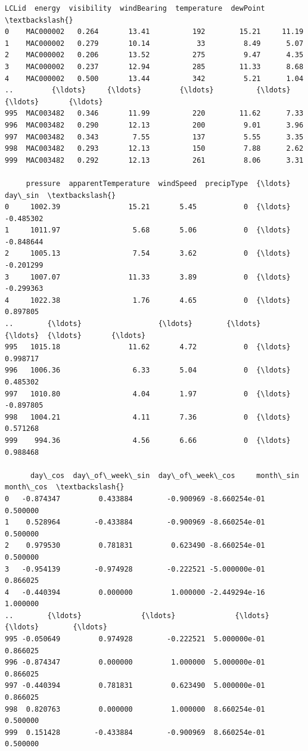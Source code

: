 \documentclass[11pt]{article}
\makeatletter
\newcommand{\boxspacing}{\kern\kvtcb@left@rule\kern\kvtcb@boxsep}
\newcommand{\prompt}[4]{
        {\ttfamily\llap{{\color{#2}[#3]:\hspace{3pt}#4}}\vspace{-\baselineskip}}
    }
\makeatother
\begin{document}
            \begin{tcolorbox}[breakable, size=fbox, boxrule=.5pt, pad at break*=1mm, opacityfill=0]
\prompt{Out}{outcolor}{158}{\boxspacing}
\begin{Verbatim}[commandchars=\\\{\}]
         LCLid  energy  visibility  windBearing  temperature  dewPoint  \textbackslash{}
0    MAC000002   0.264       13.41          192        15.21     11.19
1    MAC000002   0.279       10.14           33         8.49      5.07
2    MAC000002   0.206       13.52          275         9.47      4.35
3    MAC000002   0.237       12.94          285        11.33      8.68
4    MAC000002   0.500       13.44          342         5.21      1.04
..         {\ldots}     {\ldots}         {\ldots}          {\ldots}          {\ldots}       {\ldots}
995  MAC003482   0.346       11.99          220        11.62      7.33
996  MAC003482   0.290       12.13          200         9.01      3.96
997  MAC003482   0.343        7.55          137         5.55      3.35
998  MAC003482   0.293       12.13          150         7.88      2.62
999  MAC003482   0.292       12.13          261         8.06      3.31

     pressure  apparentTemperature  windSpeed  precipType  {\ldots}   day\_sin  \textbackslash{}
0     1002.39                15.21       5.45           0  {\ldots} -0.485302
1     1011.97                 5.68       5.06           0  {\ldots} -0.848644
2     1005.13                 7.54       3.62           0  {\ldots} -0.201299
3     1007.07                11.33       3.89           0  {\ldots} -0.299363
4     1022.38                 1.76       4.65           0  {\ldots}  0.897805
..        {\ldots}                  {\ldots}        {\ldots}         {\ldots}  {\ldots}       {\ldots}
995   1015.18                11.62       4.72           0  {\ldots}  0.998717
996   1006.36                 6.33       5.04           0  {\ldots}  0.485302
997   1010.80                 4.04       1.97           0  {\ldots} -0.897805
998   1004.21                 4.11       7.36           0  {\ldots}  0.571268
999    994.36                 4.56       6.66           0  {\ldots}  0.988468

      day\_cos  day\_of\_week\_sin  day\_of\_week\_cos     month\_sin  month\_cos  \textbackslash{}
0   -0.874347         0.433884        -0.900969 -8.660254e-01   0.500000
1    0.528964        -0.433884        -0.900969 -8.660254e-01   0.500000
2    0.979530         0.781831         0.623490 -8.660254e-01   0.500000
3   -0.954139        -0.974928        -0.222521 -5.000000e-01   0.866025
4   -0.440394         0.000000         1.000000 -2.449294e-16   1.000000
..        {\ldots}              {\ldots}              {\ldots}           {\ldots}        {\ldots}
995 -0.050649         0.974928        -0.222521  5.000000e-01   0.866025
996 -0.874347         0.000000         1.000000  5.000000e-01   0.866025
997 -0.440394         0.781831         0.623490  5.000000e-01   0.866025
998  0.820763         0.000000         1.000000  8.660254e-01   0.500000
999  0.151428        -0.433884        -0.900969  8.660254e-01   0.500000


\end{Verbatim}
\end{tcolorbox}
\end{document}
